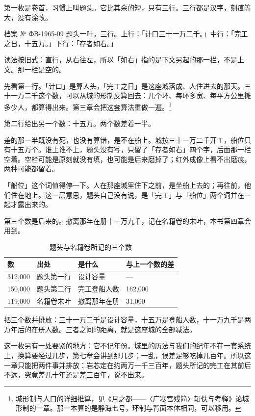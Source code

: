 第一枚是卷首，习惯上叫题头。它比其余的短，只有三行。三行都是汉字，刻痕等大，没有涂改。

\begin{archive}[内部参考]{档案 № ФВ-1965-09}
题头一叶，三行。上行：「计口三十一万二千。」中行：「完工之日，十五万。」下行：「存者如右。」
\end{archive}

读法按旧式：直行，从右往左，所以「如右」指的是下文另起的那一栏，不是上文。那一栏是空的。

先看第一行。「计口」是算人头，「完工之日」是这座城落成、人住进去的那天。三十一万二千这个数，可以从城的形制反算回去：几个环、每环多宽、每平方公里摊多少人，都算得出来。第三章会把这套算法重做一遍。\footnote{城形制与人口的详细推算，见《月之都——〈广寒宫残简〉辑佚与考释》论城形制的一章。那一本算的是静海七号，环制与背面本体相同，可以移用。}

第二行给出另一个数：十五万。两个数差着一半。

差的那一半既没有死，也没有算错，是不在船上。城按三十一万二千开工，船位只有十五万个。谁上谁不上，题头没有写，只留了「存者如右」四个字，后面那一栏空着。空栏可能是原刻就没有填，也可能是后来磨掉了；红外成像上看不出磨痕，两种可能都留着。

「船位」这个词值得停一下。人在那座城里住下之前，是坐船上去的；再往前，他们住在地上。这一层意思，题头自己没有说，是「完工」与「船位」两个词并在一起才露出来的。

第三个数是后来的。撤离那年在册十一万九千，记在名籍卷的末叶，本书第四章会用到。

\begin{table}[htbp]
\centering
\caption{题头与名籍卷所记的三个数}
\begin{tabular}{@{}llll@{}}
\toprule
数 & 出处 & 是什么 & 与上一个数的差\\
\midrule
312{,}000 & 题头第一行 & 设计容量 & — \\
150{,}000 & 题头第二行 & 完工登船人数 & 162{,}000 \\
119{,}000 & 名籍卷末叶 & 撤离那年在册 & 31{,}000 \\
\bottomrule
\end{tabular}
\end{table}把三个数并排放：三十一万二千是设计容量，十五万是登船人数，十一万九千是两万年后的在册人数。三者之间的距离，就是这座城的全部减法。

这一枚另有一处要紧的地方：它不记年份。城里的历法与我们的纪年不在一套系统上，换算要经过几步，第七章会讲到那几步；一乱，误差足够吃掉几百年。所以这一章只能把两件事并排放：岩芯定在约两万一千三百年，题头所记的完工在其前后不远，究竟差几十年还是差三百年，说不出来。

